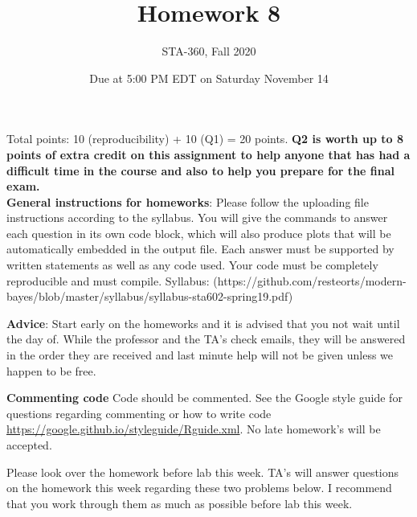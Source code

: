 \documentclass{article}
\begin{document}
\title{Homework 8}
\author{STA-360, Fall 2020}
\date{Due at 5:00 PM EDT on Saturday November 14}
\maketitle

Total points: 10 (reproducibility) + 10 (Q1) = 20 points. \textbf{Q2 is worth up to 8 points of extra credit on this assignment to help anyone that has had a difficult time in the course and also to help you prepare for the final exam.} \\

\textbf{General instructions for homeworks}: Please follow the uploading file instructions according to the syllabus. You will give the commands to answer each question in its own code block, which will also produce plots that will be automatically embedded in the output file. Each answer must be supported by written statements as well as any code used. Your code must be completely reproducible and must compile. Syllabus: (https://github.com/resteorts/modern-bayes/blob/master/syllabus/syllabus-sta602-spring19.pdf)

\textbf{Advice}: Start early on the homeworks and it is advised that you not wait until the day of. While the professor and the TA's check emails, they will be answered in the order they are received and last minute help will not be given unless we happen to be free.  

\textbf{Commenting code}
Code should be commented. See the Google style guide for questions regarding commenting or how to write 
code \url{https://google.github.io/styleguide/Rguide.xml}. No late homework's will be accepted.

Please look over the homework before lab this week. TA's will answer questions on the homework this week regarding these two 
problems below. I recommend that you work through them as much as possible before lab this week. 
\end{document}
